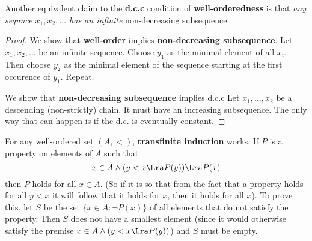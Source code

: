 Another equivalent claim to the \textbf{d.c.c} condition of \textbf{well-orderedness}
is that \textit{any sequnce $x_1, x_2,\ldots$ has an infinite} non-decreasing subsequence.
\begin{proof}
    We show that \textbf{well-order} implies \textbf{non-decreasing subsequence}.
    \smallLine
    Let $x_1, x_2, \ldots$ be an infinite sequence. Choose $y_1$
    as the minimal element of all $x_i$. Then choose $y_2$ as the minimal element
    of the sequence starting at the first occurence of $y_1$. Repeat.

    \myLine
    We show that \textbf{non-decreasing subsequence} implies d.c.c
    Let $x_1, \ldots, x_2$ be a descending (non-strictly) chain.
    It must have an increasing subsequence. The only way that can happen is if 
    the d.c. is eventually constant.

\end{proof}

For any well-ordered set $(A, <)$, \textbf{transfinite induction} works.
If $P$ is a property on elements of $A$ such that 
\[
x\in A \wedge (y < x \Lra P(y)) \Lra P(x)
\]
then $P$ holds for all $x\in A$.
(So if it is so that from the fact that a property holds for all $y<x$
it will follow that it holds for $x$, then it holds for all $x$).
To prove this, let $S$ be the set $\{x\in A: \neg P(x)\}$ of all elements 
that do not satisfy the property. Then $S$ does not have a smallest 
element (since it would otherwise satisfy the premise 
$x\in A \wedge (y < x \Lra P(y))$) and $S$ must be empty.




